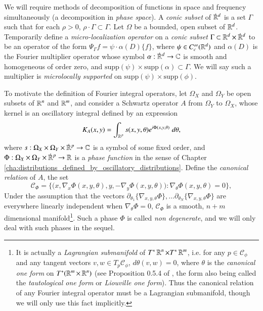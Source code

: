 We will require methods of decomposition of functions in space and frequency simultaneously (a decomposition in \emph{phase space}). A \emph{conic subset} of ${\dot{\RR}{\vphantom{\RR}}^d}$ is a set $\Gamma$ such that for each $\rho > 0$, $\rho \cdot \Gamma \subset \Gamma$. Let $\Omega$ be a bounded, open subset of $\operatorname{\mathbb{R}}^d$. Temporarily define a \emph{micro-localization operator} on a \emph{conic subset} $\Gamma \subset {\RR^d} \times {\dot{\RR}{\vphantom{\RR}}^d}$ to be an operator of the form $\Psi_\Gamma f = \psi \cdot \alpha(D) \{ f \}$, where $\psi \in C_c^\infty(\operatorname{\mathbb{R}}^d)$ and  $\alpha(D)$ is the Fourier multiplier operator whose symbol $\alpha: {\dot{\RR}{\vphantom{\RR}}^d} \to \CC$ is smooth and homogeneous of order zero, and $\text{supp}(\psi) \times \text{supp}(\alpha) \subset \Gamma$. We will say such a multiplier is \emph{microlocally supported} on $\text{supp}(\psi) \times \text{supp}(\phi)$.

To motivate the definition of Fourier integral operators, let $\Omega_X$ and $\Omega_Y$ be open subsets of $\operatorname{\mathbb{R}}^n$ and $\operatorname{\mathbb{R}}^m$, and consider a Schwartz operator $A$ from $\Omega_Y$ to $\Omega_X$, whose kernel is an oscillatory integral defined by an expression
%
\begin{equation}
  K_A(x,y) = \int_{\operatorname{\mathbb{R}}^p} s(x,y,\theta) e^{i \Phi(x,y,\theta)}\; d\theta,
\end{equation}
%
where $s: \Omega_X \times {\Omega_Y} \times {{\dot{\RR}{\vphantom{\RR}}^p}} \to \CC$ is a symbol of some fixed order, and $\Phi: \Omega_X \times \Omega_Y \times {\dot{\RR}{\vphantom{\RR}}^p} \to \RR$ is a \emph{phase function} in the sense of Chapter \ref{cha:distributions_defined_by_oscillatory_distributions}. Define the \emph{canonical relation} of $A$, the set
%
\begin{equation}
  \mathcal{C}_\Phi = \Big\{ \big(x, \nabla_x \Phi(x,y,\theta) ,y, -\nabla_y \Phi(x,y,\theta) \big) : \nabla_\theta \Phi(x,y,\theta) = 0 \Big\},
\end{equation}
%
Under the assumption that the vectors $\partial_{\theta_1} \{ \nabla_{x,y,\theta} \Phi \}, \dots \partial_{\theta_N} \{ \nabla_{x,y,\theta} \Phi \}$ are everywhere linearly independent when $\nabla_\theta \Phi = 0$, $\mathcal{C}_\Phi$ is a smooth, $n + m$ dimensional manifold\footnote{It is actually a \emph{Lagrangian submanifold} of $T^* \operatorname{\mathbb{R}}^n \times T^* \operatorname{\mathbb{R}}^m$, i.e. for any $p \in \mathcal{C}_\phi$ and any tangent vectors $v,w \in T_p \mathcal{C}_\phi$, $d\theta(v,w) = 0$, where $\theta$ is the \emph{canonical one form} on $T^*(\operatorname{\mathbb{R}}^m \times \operatorname{\mathbb{R}}^n)$ (see Proposition 0.5.4 of \cite{Sogge}, the form also being called the \emph{tautological one form} or \emph{Liouville one form}). Thus the canonical relation of any Fourier integral operator must be a Lagrangian submanifold, though we will only use this fact implicitly.}. Such a phase $\Phi$ is called \emph{non degenerate}, and we will only deal with such phases in the sequel.

